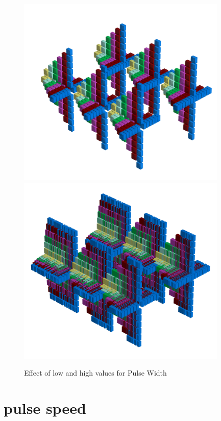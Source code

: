 \begin{figure}[H]
    \centering
    \begin{adjustbox}{width=15cm,center}
      \includegraphics[width=10cm]{src/pulsewidth/pattern0-45.png}%
      \includegraphics[width=10cm]{src/pulsewidth/pattern1-45.png}%
    \end{adjustbox}
    \caption{Effect of low and high values for Pulse Width}
\end{figure}
\clearpage
\section*{pulse speed}
\label{sec:pulse_speed}
\lstset{style=6502Style}
\lstset{ 
   aboveskip=5pt,
   belowskip=0pt,
}

